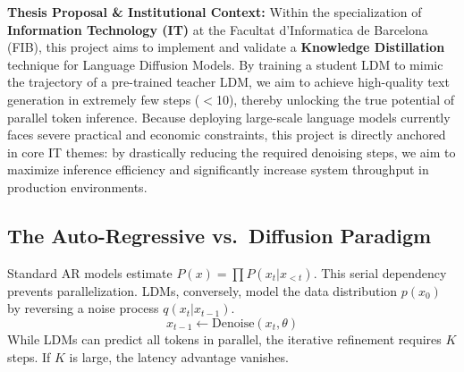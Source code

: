 \documentclass[11pt, a4paper]{article}
\begin{document}
\textbf{Thesis Proposal \& Institutional Context:} Within the specialization of \textbf{Information Technology (IT)} at the Facultat d'Informatica de Barcelona (FIB), this project aims to implement and validate a \textbf{Knowledge Distillation} technique for Language Diffusion Models. By training a student LDM to mimic the trajectory of a pre-trained teacher LDM, we aim to achieve high-quality text generation in extremely few steps ($<$10), thereby unlocking the true potential of parallel token inference. Because deploying large-scale language models currently faces severe practical and economic constraints, this project is directly anchored in core IT themes: by drastically reducing the required denoising steps, we aim to maximize inference efficiency and significantly increase system throughput in production environments.

\subsection{The Auto-Regressive vs.\ Diffusion Paradigm}
Standard AR models estimate $P(x) = \prod P(x_t | x_{<t})$. This serial dependency prevents parallelization. LDMs, conversely, model the data distribution $p(x_0)$ by reversing a noise process $q(x_t | x_{t-1})$.
\begin{equation}
    x_{t-1} \leftarrow \text{Denoise}(x_t, \theta)
\end{equation}
While LDMs can predict all tokens in parallel, the iterative refinement requires $K$ steps. If $K$ is large, the latency advantage vanishes.
\end{document}
